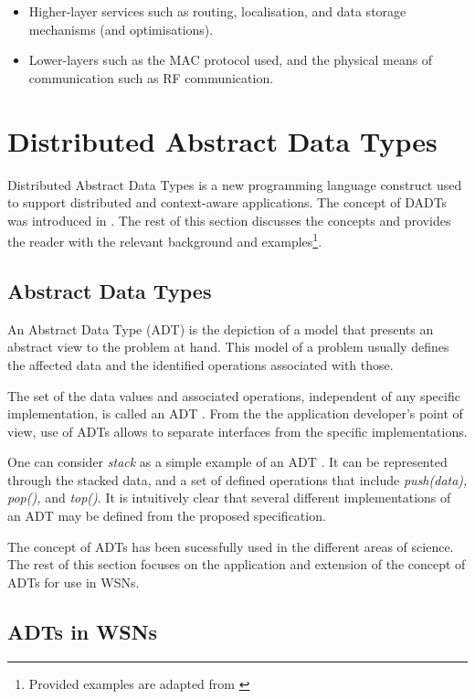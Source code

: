 \begin{itemize}
  \item Higher-layer services such as routing, localisation, and data storage
  mechanisms (and optimisations).
  \item Lower-layers such as the MAC protocol used, and the physical means of
  communication such as RF communication.
\end{itemize}

\section {Distributed Abstract Data Types} \label{sec:DADT}

Distributed Abstract Data Types is a new programming language construct used to
support distributed and context-aware applications. The concept of DADTs was
introduced in \cite{migliavacca_DADT:2006}. 
The rest of this section discusses the concepts and provides the reader with
the relevant background and examples\footnote{Provided examples are
adapted from \cite{migliavacca_DADT:2006}}.

\subsection{Abstract Data Types}

An Abstract Data Type (ADT) is the depiction of a model that
presents an abstract view to the problem at hand. This model of a problem
usually defines the affected data and the identified operations associated with
those.

The set of the data values and associated operations, independent of any
specific implementation, is called an ADT \cite{NIST_website}. From the the
application developer's point of view, use of ADTs allows to separate
interfaces from the specific implementations.

One can consider \emph{stack} as a simple example of an ADT \cite{guttag_ADTs:1977}. It
can be represented through the stacked data, and a set of defined
operations that include \emph{push(data), pop(),} and \emph{top()}. It is intuitively clear that
several different implementations of an ADT may be defined from the proposed specification.

The concept of ADTs has been sucessfully used in the different areas of
science. The rest of this section focuses on the application and
extension of the concept of ADTs for use in WSNs.

\subsection{ADTs in WSNs} \label{subsubsec:ADTsinWSN}

